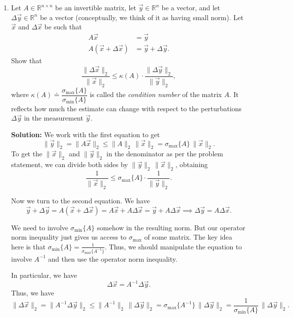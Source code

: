 \documentclass[10pt]{article}
\theoremstyle{definition}
\theoremstyle{plain}
\newcommand{\RR}{\mathbb{R}}
\begin{document}
\begin{enumerate}[label=(\alph*)]
\item Let $A \in \RR^{n \times n}$ be an invertible matrix, let $\vec{y} \in \RR^n$ be a vector, and let $\Delta\vec{y} \in \RR^n$ be a vector (conceptually, we think of it as having small norm). Let $\vec{x}$ and $\Delta\vec{x}$ be such that
\begin{align}
A\vec{x} &= \vec{y} \\
A(\vec{x} + \Delta\vec{x}) &= \vec{y} + \Delta\vec{y}.
\end{align}
Show that
\begin{equation}
\frac{\|\Delta\vec{x}\|_2}{\|\vec{x}\|_2} \le \kappa(A) \cdot \frac{\|\Delta\vec{y}\|_2}{\|\vec{y}\|_2},
\end{equation}
where $\kappa(A) \doteq \dfrac{\sigma_{\max}\{A\}}{\sigma_{\min}\{A\}}$ is called the \textit{condition number} of the matrix $A$. It reflects how much the estimate can change with respect to the perturbations $\Delta\vec{y}$ in the measurement $\vec{y}$.

\textbf{Solution:} We work with the first equation to get
\begin{equation}
\|\vec{y}\|_2 = \|A\vec{x}\|_2 \le \|A\|_2 \, \|\vec{x}\|_2 = \sigma_{\max}\{A\} \, \|\vec{x}\|_2.
\end{equation}
To get the $\|\vec{x}\|_2$ and $\|\vec{y}\|_2$ in the denominator as per the problem statement, we can divide both sides by $\|\vec{y}\|_2 \, \|\vec{x}\|_2$, obtaining
\begin{equation}
\frac{1}{\|\vec{x}\|_2} \le \sigma_{\max}\{A\} \cdot \frac{1}{\|\vec{y}\|_2}.
\end{equation}

Now we turn to the second equation. We have
\begin{equation}
\vec{y} + \Delta\vec{y} = A(\vec{x} + \Delta\vec{x}) = A\vec{x} + A\Delta\vec{x} = \vec{y} + A\Delta\vec{x} \implies \Delta\vec{y} = A\Delta\vec{x}.
\end{equation}

We need to involve $\sigma_{\min}\{A\}$ somehow in the resulting norm. But our operator norm inequality just gives us access to $\sigma_{\max}$ of some matrix. The key idea here is that $\sigma_{\min}\{A\} = \frac{1}{\sigma_{\max}\{A^{-1}\}}$. Thus, we should manipulate the equation to involve $A^{-1}$ and then use the operator norm inequality.

In particular, we have
\begin{equation}
\Delta\vec{x} = A^{-1} \Delta\vec{y}.
\end{equation}
Thus, we have
\begin{equation}
\|\Delta\vec{x}\|_2 = \|A^{-1} \Delta\vec{y}\|_2 \le \|A^{-1}\|_2 \, \|\Delta\vec{y}\|_2 = \sigma_{\max}\{A^{-1}\} \, \|\Delta\vec{y}\|_2 = \frac{1}{\sigma_{\min}\{A\}} \, \|\Delta\vec{y}\|_2.
\end{equation}


\end{enumerate}
\end{document}
